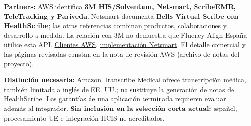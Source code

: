 \textbf{Partners:} AWS identifica \textbf{3M HIS/\allowbreak{}Solventum, Netsmart, ScribeEMR, TeleTracking y Pariveda}. Netsmart documenta \textbf{Bells Virtual Scribe con HealthScribe}; las otras referencias combinan productos, colaboraciones y desarrollo a medida. La relación con 3M no demuestra que Fluency Align España utilice esta API. \href{https://aws.amazon.com/healthscribe/customers/}{Clientes AWS}, \href{https://aws.amazon.com/blogs/industries/netsmart-transforms-behavioral-healthcare-with-new-feature-of-aws-healthscribe/}{implementación Netsmart}. El detalle comercial y las páginas revisadas constan en la nota de revisión AWS (archivo de notas del proyecto).

\textbf{Distinción necesaria:} \href{https://docs.aws.amazon.com/transcribe/latest/dg/transcribe-medical.html}{Amazon Transcribe Medical} ofrece transcripción médica, también limitada a inglés de EE. UU.; no sustituye la generación de notas de HealthScribe. Las garantías de una aplicación terminada requieren evaluar además al integrador. \textbf{Sin inclusión en la selección corta actual:} español, procesamiento UE e integración HCIS no acreditados.
\endgroup
